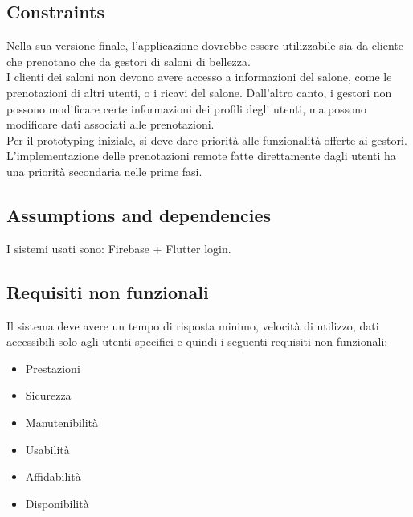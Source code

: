 \documentclass{article}
\begin{document}
\subsection {Constraints} 
Nella sua versione finale, l’applicazione dovrebbe essere utilizzabile sia da cliente che prenotano che da gestori di saloni di bellezza. 
\\I clienti dei saloni non devono avere accesso a informazioni del salone, come le prenotazioni di altri utenti, o i ricavi del salone. Dall’altro canto, i gestori non possono modificare certe informazioni dei profili degli utenti, ma possono modificare dati associati alle prenotazioni. 
\\Per il prototyping iniziale, si deve dare priorità alle funzionalità offerte ai gestori. L’implementazione delle prenotazioni remote fatte direttamente dagli utenti ha una priorità secondaria nelle prime fasi.
\subsection {Assumptions and dependencies} I sistemi usati sono: Firebase + Flutter login.
\subsection {Requisiti non funzionali} 
Il sistema deve avere un tempo di risposta minimo, velocità di utilizzo, dati accessibili solo
agli utenti specifici e quindi i seguenti requisiti non funzionali:
\begin{itemize}
    \item Prestazioni
    \item Sicurezza
    \item Manutenibilità
    \item Usabilità
    \item Affidabilità
    \item Disponibilità
\end{itemize}
\end{document}
